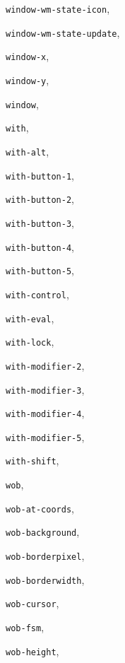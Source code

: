 \begin{theindex}
\item {\tt window-wm-state-icon}, {\bf\pageref{window-wm-state-icon}}
\item {\tt window-wm-state-update}, {\bf\pageref{window-wm-state-update}}
\item {\tt window-x}, {\bf\pageref{window-x}}
\item {\tt window-y}, {\bf\pageref{window-y}}
\item {\tt window}, {\bf\pageref{window}}
\item {\tt with}, {\bf\pageref{with}}
\item {\tt with-alt}, {\bf\pageref{with-alt}}
\item {\tt with-button-1}, {\bf\pageref{with-button-N}}
\item {\tt with-button-2}, {\bf\pageref{with-button-N}}
\item {\tt with-button-3}, {\bf\pageref{with-button-N}}
\item {\tt with-button-4}, {\bf\pageref{with-button-N}}
\item {\tt with-button-5}, {\bf\pageref{with-button-N}}
\item {\tt with-control}, {\bf\pageref{with-control}}
\item {\tt with-eval}, {\bf\pageref{with-eval}}
\item {\tt with-lock}, {\bf\pageref{with-lock}}
\item {\tt with-modifier-2}, {\bf\pageref{with-modifier-N}}
\item {\tt with-modifier-3}, {\bf\pageref{with-modifier-N}}
\item {\tt with-modifier-4}, {\bf\pageref{with-modifier-N}}
\item {\tt with-modifier-5}, {\bf\pageref{with-modifier-N}}
\item {\tt with-shift}, {\bf\pageref{with-shift}}
\item {\tt wob}, {\bf\pageref{wob}}
\item {\tt wob-at-coords}, {\bf\pageref{wob-at-coords}}
\item {\tt wob-background}, {\bf\pageref{wob-background}}
\item {\tt wob-borderpixel}, {\bf\pageref{wob-borderpixel}}
\item {\tt wob-borderwidth}, {\bf\pageref{wob-borderwidth}}
\item {\tt wob-cursor}, {\bf\pageref{wob-cursor}}
\item {\tt wob-fsm}, {\bf\pageref{wob-fsm}}
\item {\tt wob-height}, {\bf\pageref{wob-height}}

\end{theindex}

